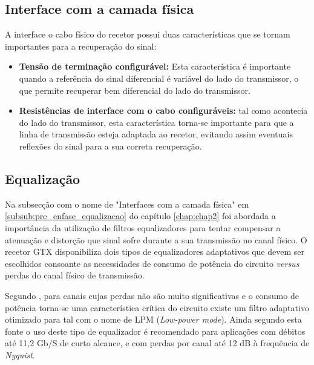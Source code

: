 \subsection{Interface com a camada física}

A interface o cabo físico do recetor possui duas características que se tornam importantes para a recuperação do sinal:
\begin{itemize}
	\item \textbf{Tensão de terminação configurável:} Esta característica é importante quando a referência do sinal diferencial é variável do lado do transmissor, o que permite recuperar bem diferencial do lado do transmissor.
	\item \textbf{Resistências de interface com o cabo configuráveis:} tal como acontecia do lado do transmissor, esta característica torna-se importante para que a linha de transmissão esteja adaptada ao recetor, evitando assim eventuais reflexões do sinal para a sua correta recuperação.


\end{itemize}


\subsection{Equalização} \label{subsub:rx_equalização}

Na subsecção com o nome de "Interfaces com a camada física" em \ref{subsub:pre_enfase_equalizacao} do capítulo \ref{chap:chap2} foi abordada a importância da utilização de filtros equalizadores para tentar compensar a atenuação e distorção que sinal sofre durante a sua transmissão no canal físico. O recetor GTX disponibiliza dois tipos de equalizadores adaptativos que devem ser escolhidos consoante as necessidades de consumo de potência do circuito \textit{versus} perdas do canal físico de transmissão.

Segundo \cite{R011}, para canais cujas perdas não são muito significativas e o consumo de potência torna-se uma característica crítica do circuito existe um filtro adaptativo otimizado para tal com o nome de LPM (\textit{Low-power mode}). Ainda segundo esta fonte o uso deste tipo de equalizador é recomendado para aplicações com débitos até 11,2 Gb/S de curto alcance, e com perdas por canal até 12 dB à frequência de \textit{Nyquist}.


